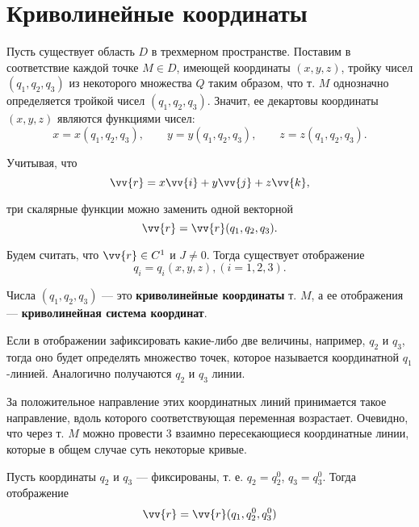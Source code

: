 \documentclass[a4paper,12pt,oneside]{extbook}
\theoremstyle{numbered}
\theoremstyle{unnumbered}
\theoremstyle{named}
\theoremstyle{unnumbered}
\theoremstyle{named}
\theoremstyle{named}
\theoremstyle{named}
\begin{document}
\section{Криволинейные координаты}
\label{sec:Криволинейные координаты}

Пусть существует область \(D\) в трехмерном пространстве. Поставим в соответствие каждой точке \(M \in D\), имеющей координаты \((x, y, z)\), тройку чисел \((q_1, q_2, q_3)\) из некоторого множества \(Q\) таким образом, что т. \(M\) однозначно определяется тройкой чисел \((q_1, q_2, q_3)\). Значит, ее декартовы координаты \((x, y, z)\) являются функциями чисел:
\begin{equation}
    x = x(q_1, q_2, q_3),
    \qquad
    y = y(q_1, q_2, q_3),
    \qquad
    z = z(q_1, q_2, q_3).
\end{equation}

Учитывая, что
\begin{equation}
    \vv{r} = x \vv{i} + y \vv{j} + z \vv{k},
\end{equation}

три скалярные функции можно заменить одной векторной
\begin{equation}
    \vv{r} = \vv{r}(q_1, q_2, q_3).
\end{equation}

Будем считать, что \(\vv{r} \in C^1\) и \(J \neq 0\). Тогда существует отображение
\begin{equation}
    q_i = q_i(x, y, z), (i = 1, 2, 3).
\end{equation}

Числа \((q_1, q_2, q_3)\) — это \textbf{криволинейные координаты} т. \(M\), а ее отображения — \textbf{криволинейная система координат}.

Если в отображении зафиксировать какие-либо две величины, например, \(q_2\) и \(q_3\), тогда оно будет определять множество точек, которое называется координатной \(q_1\)-линией. Аналогично получаются \(q_2\) и \(q_3\) линии.

За положительное направление этих координатных линий принимается такое направление, вдоль которого соответствующая переменная возрастает. Очевидно, что через т. \(M\) можно провести 3 взаимно пересекающиеся координатные линии, которые в общем случае суть некоторые кривые.

Пусть координаты \(q_2\) и \(q_3\) — фиксированы, т. е. \(q_2 = q_2^0\), \(q_3 = q_3^0\). Тогда отображение
\begin{equation}
    \vv{r} = \vv{r}(q_1, q_2^0, q_3^0)
\end{equation}
\end{document}
